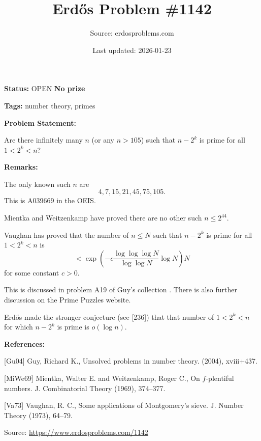 \documentclass{article}
\title{Erd\H{o}s Problem \#1142}
\date{Last updated: 2026-01-23}
\author{Source: erdosproblems.com}
\begin{document}
\maketitle

\noindent\textbf{Status:} OPEN \quad \textbf{No prize}

\noindent\textbf{Tags:} number theory, primes

\medskip
\noindent\textbf{Problem Statement:}

Are there infinitely many $n$ (or any $n>105$) such that $n-2^k$ is prime for all $1<2^k<n$?

\bigskip
\noindent\textbf{Remarks:}

The only known such $n$ are\[4,7,15,21,45,75,105.\]This is A039669 in the OEIS.

Mientka and Weitzenkamp \cite{MiWe69} have proved there are no other such $n\leq 2^{44}$.

Vaughan \cite{Va73} has proved that the number of $n\leq N$ such that $n-2^k$ is prime for all $1<2^k<n$ is\[< \exp\left(-c\frac{\log \log \log N}{\log\log N}\log N\right)N\]for some constant $c>0$.

This is discussed in problem A19 of Guy's collection \cite{Gu04}. There is also further discussion on the Prime Puzzles website.

Erd\H{o}s made the stronger conjecture (see [236]) that that number of $1<2^k<n$ for which $n-2^k$ is prime is $o(\log n)$.

\bigskip
\noindent\textbf{References:}

[Gu04] Guy, Richard K., Unsolved problems in number theory. (2004), xviii+437.
 
 [MiWe69] Mientka, Walter E. and Weitzenkamp, Roger C., On {$f$}-plentiful numbers. J. Combinatorial Theory (1969), 374--377.
 
 [Va73] Vaughan, R. C., Some applications of {M}ontgomery's sieve. J. Number Theory (1973), 64--79.

\bigskip
\noindent\small{Source: \url{https://www.erdosproblems.com/1142}}
\end{document}
